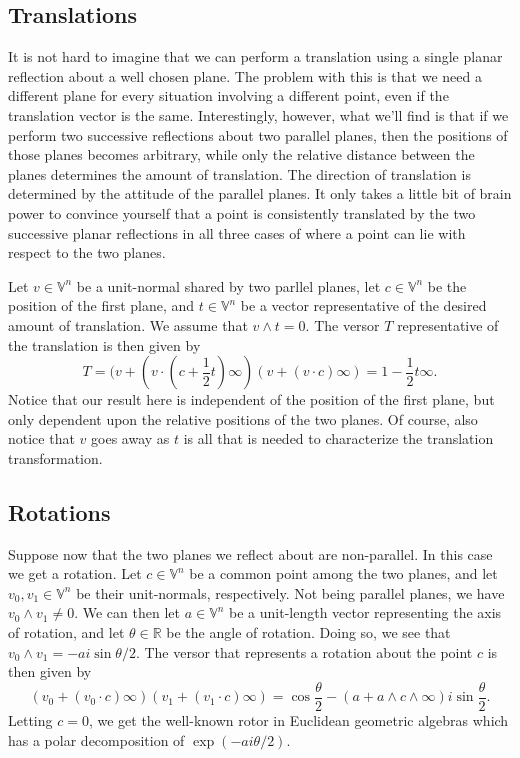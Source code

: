 \documentclass[12pt]{article}
\newcommand{\V}{\mathbb{V}}
\newcommand{\R}{\mathbb{R}}
\newcommand{\nvai}{\infty}
\begin{document}
\subsection{Translations}\label{sec_translation_versors}

It is not hard to imagine that we can perform a translation
using a single planar reflection about a well chosen plane.
The problem with this is that we need a different plane for
every situation involving a different point, even if the translation
vector is the same.  Interestingly, however, what we'll find is that
if we perform two successive reflections about two parallel planes, then
the positions of those planes becomes arbitrary, while only the relative
distance between the planes determines the amount of translation.
The direction of translation is determined by the attitude of the parallel planes.
It only takes a little bit of brain power to convince yourself that a point is consistently
translated by the two successive planar reflections in all three cases of where
a point can lie with respect to the two planes.

Let $v\in\V^n$ be a unit-normal shared by two parllel planes, let
$c\in\V^n$ be the position of the first plane, and $t\in\V^n$
be a vector representative of the desired amount of translation.
We assume that $v\wedge t=0$.
The versor $T$ representative of the translation is then given by
\begin{equation*}
T = (v+(v\cdot(c+\frac{1}{2}t)\nvai)(v+(v\cdot c)\nvai) = 1 - \frac{1}{2}t\nvai.
\end{equation*}
Notice that our result here is independent of the position of the
first plane, but only dependent upon the relative positions of
the two planes.
Of course, also notice that $v$ goes away as $t$ is all that
is needed to characterize the translation transformation.


\subsection{Rotations}

Suppose now that the two planes we reflect about are
non-parallel.  In this case we get a rotation.  Let $c\in\V^n$
be a common point among the two planes, and let $v_0,v_1\in\V^n$
be their unit-normals, respectively.  Not being parallel planes,
we have $v_0\wedge v_1\neq 0$.  We can then let $a\in\V^n$
be a unit-length vector representing the axis of rotation, and
let $\theta\in\R$ be the angle of rotation.  Doing so, we see
that $v_0\wedge v_1=-ai\sin\theta/2$.  The versor that
represents a rotation about the point $c$ is then given by
\begin{equation*}
(v_0+(v_0\cdot c)\nvai)(v_1+(v_1\cdot c)\nvai) = \cos\frac{\theta}{2} - (a+a\wedge c\wedge\nvai)i\sin\frac{\theta}{2}.
\end{equation*}
Letting $c=0$, we get the well-known rotor in Euclidean geometric algebras which
has a polar decomposition of $\exp(-ai\theta/2)$.
\end{document}
